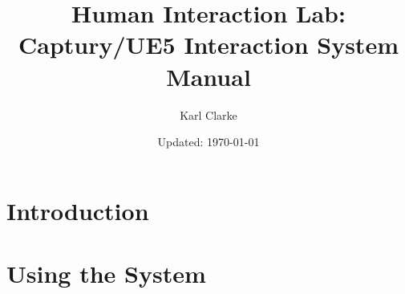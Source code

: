 \documentclass{report}
\title{Human Interaction Lab: Captury/UE5 Interaction System Manual}
\author{Karl Clarke}
\date{Updated: \today}
\begin{document}
\maketitle
\tableofcontents

\onehalfspacing %

\chapter{Introduction}


\chapter{Using the System}

\end{document}
